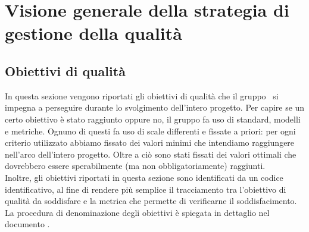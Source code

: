 \documentclass[../PianoDiQualifica.tex]{subfiles}
\begin{document}
\section{Visione generale della strategia di gestione della qualità}
	\subsection{Obiettivi di qualità}\label{ObiettiviDiQualità}
	In questa sezione vengono riportati gli obiettivi di qualità che il gruppo \leaf\ si impegna a perseguire durante lo svolgimento dell'intero progetto. Per capire se un certo obiettivo è stato raggiunto oppure no, il gruppo fa uso di standard, modelli e metriche. Ognuno di questi fa uso di scale differenti e fissate a priori: per ogni criterio utilizzato abbiamo fissato dei valori minimi che intendiamo raggiungere nell'arco dell'intero progetto. Oltre a ciò sono stati fissati dei valori ottimali che dovrebbero essere sperabilmente (ma non obbligatoriamente) raggiunti.\\
	Inoltre, gli obiettivi riportati in questa sezione sono identificati da un codice identificativo, al fine di rendere più semplice il tracciamento tra l'obiettivo di qualità da soddisfare e la metrica che permette di verificarne il soddisfacimento.\\
	La procedura di denominazione degli obiettivi è spiegata in dettaglio nel documento \normediprogettov.
	
\end{document}
